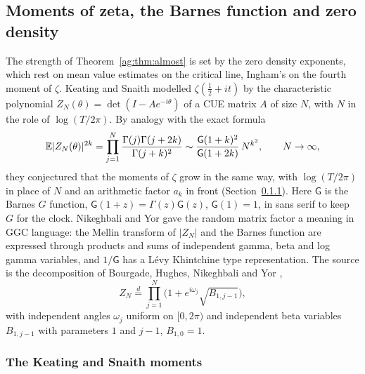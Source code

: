 \subsection{Moments of zeta, the Barnes function and zero density}\label{ag:sec:moments}

The strength of Theorem~\ref{ag:thm:almost} is set by the zero density exponents, which rest on mean value estimates on the critical line, Ingham's on the fourth moment of $\zeta$. Keating and Snaith \cite{KS00} modelled $\zeta(\frac12+it)$ by the characteristic polynomial $Z_N(\theta)=\det(I-Ae^{-i\theta})$ of a CUE matrix $A$ of size $N$, with $N$ in the role of $\log(T/2\pi)$. By analogy with the exact formula
\[
\mathbb{E}|Z_N(\theta)|^{2k}=\prod_{j=1}^N\frac{\Gamma(j)\Gamma(j+2k)}{\Gamma(j+k)^2}\sim\frac{\mathsf G(1+k)^2}{\mathsf G(1+2k)}\,N^{k^2},\qquad N\to\infty,
\]
they conjectured that the moments of $\zeta$ grow in the same way, with $\log(T/2\pi)$ in place of $N$ and an arithmetic factor $a_k$ in front (Section~\ref{ag:sec:ks}). Here $\mathsf G$ is the Barnes $G$ function, $\mathsf G(1+z)=\Gamma(z)\mathsf G(z)$, $\mathsf G(1)=1$, in sans serif to keep $G$ for the clock. Nikeghbali and Yor \cite{NY09} gave the random matrix factor a meaning in GGC language: the Mellin transform of $|Z_N|$ and the Barnes function are expressed through products and sums of independent gamma, beta and log gamma variables, and $1/\mathsf G$ has a L\'evy Khintchine type representation. The source is the decomposition of Bourgade, Hughes, Nikeghbali and Yor \cite{BHNY08},
\[
Z_N\stackrel d=\prod_{j=1}^N\Big(1+e^{i\omega_j}\sqrt{B_{1,j-1}}\Big),
\]
with independent angles $\omega_j$ uniform on $[0,2\pi)$ and independent beta variables $B_{1,j-1}$ with parameters $1$ and $j-1$, $B_{1,0}=1$.

\subsubsection{The Keating and Snaith moments}\label{ag:sec:ks}

